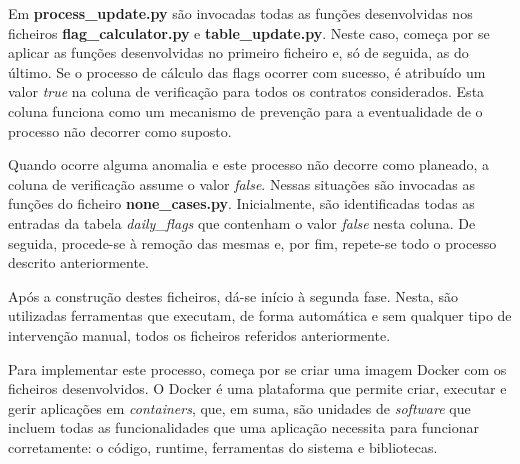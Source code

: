 Em \textbf{process\_update.py} são invocadas todas as funções desenvolvidas nos ficheiros \textbf{flag\_calculator.py} e \textbf{table\_update.py}. Neste caso, começa por se aplicar as funções desenvolvidas no primeiro ficheiro e, só de seguida, as do último. Se o processo de cálculo das flags ocorrer com sucesso, é atribuído um valor \textit{true} na coluna de verificação para todos os contratos considerados. Esta coluna funciona como um mecanismo de prevenção para a eventualidade de o processo não decorrer como suposto. 

Quando ocorre alguma anomalia e este processo não decorre como planeado, a coluna de verificação assume o valor \textit{false}. Nessas situações são invocadas as funções do ficheiro \textbf{none\_cases.py}. Inicialmente, são identificadas todas as entradas da tabela \textit{daily\_flags} que contenham o valor \textit{false} nesta coluna. De seguida, procede-se à remoção das mesmas e, por fim, repete-se todo o processo descrito anteriormente.





Após a construção destes ficheiros, dá-se início à segunda fase. Nesta, são utilizadas ferramentas que executam, de forma automática e sem qualquer tipo de intervenção manual, todos os ficheiros referidos anteriormente.

Para implementar este processo, começa por se criar uma imagem Docker com os ficheiros desenvolvidos. O Docker é uma plataforma que permite criar, executar e gerir aplicações em \textit{containers}, que, em suma, são unidades de \textit{software} que incluem todas as funcionalidades que uma aplicação necessita para funcionar corretamente: o código, runtime, ferramentas do sistema e bibliotecas.

